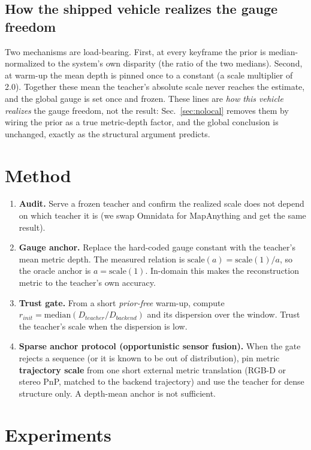 \subsection{How the shipped vehicle realizes the gauge freedom}

Two mechanisms are load-bearing. First, at every keyframe the prior is
median-normalized to the system's own disparity (the ratio of the two medians).
Second, at warm-up the mean depth is pinned once to a constant (a scale
multiplier of 2.0). Together these mean the teacher's absolute scale never reaches the estimate, and
the global gauge is set once and frozen. These lines are \emph{how this vehicle
realizes} the gauge freedom, not the result: Sec.~\ref{sec:nolocal} removes them by wiring the
prior as a true metric-depth factor, and the global conclusion is unchanged,
exactly as the structural argument predicts.

\section{Method}

\begin{enumerate}
\item \textbf{Audit.} Serve a frozen teacher and confirm the realized scale does
  not depend on which teacher it is (we swap Omnidata for MapAnything and get the
  same result).
\item \textbf{Gauge anchor.} Replace the hard-coded gauge constant with the
  teacher's mean metric depth. The measured relation is
  $\mathrm{scale}(a)=\mathrm{scale}(1)/a$, so the oracle anchor is
  $a=\mathrm{scale}(1)$. In-domain this makes the reconstruction metric to the
  teacher's own accuracy.
\item \textbf{Trust gate.} From a short \emph{prior-free} warm-up, compute
  $r_{init}=\mathrm{median}(D_{teacher}/D_{backend})$ and its dispersion over the
  window. Trust the teacher's scale when the dispersion is low.
\item \textbf{Sparse anchor protocol (opportunistic sensor fusion).} When the
  gate rejects a sequence (or it is known to be out of distribution), pin metric
  \textbf{trajectory scale} from one short external metric translation (RGB-D or
  stereo PnP, matched to the backend trajectory) and use the teacher for dense
  structure only. A depth-mean anchor is not sufficient.
\end{enumerate}

\section{Experiments}

